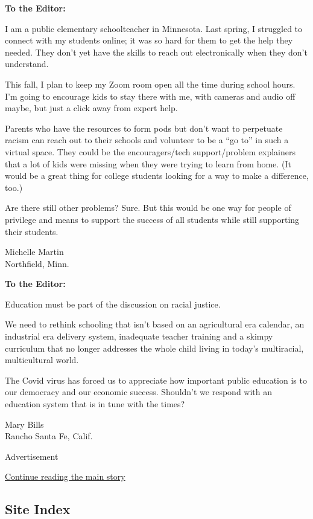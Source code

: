 \textbf{To the Editor:}

I am a public elementary schoolteacher in Minnesota. Last spring, I
struggled to connect with my students online; it was so hard for them to
get the help they needed. They don't yet have the skills to reach out
electronically when they don't understand.

This fall, I plan to keep my Zoom room open all the time during school
hours. I'm going to encourage kids to stay there with me, with cameras
and audio off maybe, but just a click away from expert help.

Parents who have the resources to form pods but don't want to perpetuate
racism can reach out to their schools and volunteer to be a ``go to'' in
such a virtual space. They could be the encouragers/tech support/problem
explainers that a lot of kids were missing when they were trying to
learn from home. (It would be a great thing for college students looking
for a way to make a difference, too.)

Are there still other problems? Sure. But this would be one way for
people of privilege and means to support the success of all students
while still supporting their students.

Michelle Martin\\
Northfield, Minn.

\textbf{To the Editor:}

Education must be part of the discussion on racial justice.

We need to rethink schooling that isn't based on an agricultural era
calendar, an industrial era delivery system, inadequate teacher training
and a skimpy curriculum that no longer addresses the whole child living
in today's multiracial, multicultural world.

The Covid virus has forced us to appreciate how important public
education is to our democracy and our economic success. Shouldn't we
respond with an education system that is in tune with the times?

Mary Bills\\
Rancho Santa Fe, Calif.

Advertisement

\protect\hyperlink{after-bottom}{Continue reading the main story}

\hypertarget{site-index}{%
\subsection{Site Index}\label{site-index}}

